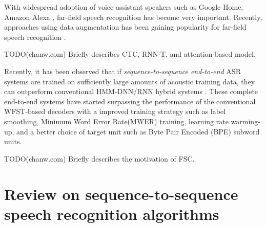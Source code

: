 \documentclass{article}
\begin{document}
With widespread adoption of voice assistant speakers
such as Google Home, Amazon Alexa
\cite{B_Li_INTERSPEECH_2017_1, C_Kim_INTERSPEECH_2017_1},
far-field speech recognition has become very important.
Recently, approaches using data augmentation
has been gaining popularity for far-field speech recognition
\cite{R_Lippmann_icassp_1987_1,
c_kim_interspeech_2018_00, w_hartmann_interspeech_2016_00}.

TODO(chanw.com) Briefly describes CTC, RNN-T, and attention-based model.

Recently, it has been observed that if 
{\it sequence-to-sequence end-to-end} ASR systems are trained on sufficiently 
large amounts of acoustic training data, they can outperform
conventional HMM-DNN/RNN hybrid systems \cite{c_chiu_icassp_2018_00, 
c_kim_interspeech_2019_00}.
These complete end-to-end systems have started surpassing the performance of
the conventional WFST-based decoders with a improved training strategy
such as label smoothing, Minimum Word Error Rate(MWER) training, 
learning rate warming-up,
and a better choice of target unit such as Byte Pair Encoded (BPE) 
\cite {r_sennrich_acl_2016_00} subword units.

TODO(chanw.com) Briefly describes the motivation of FSC.



\section{Review on sequence-to-sequence speech recognition algorithms}
\end{document}
